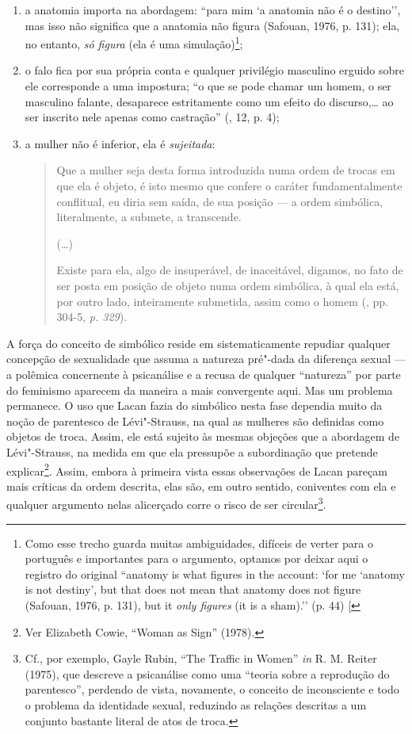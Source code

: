 \begin{enumerate}
\def\labelenumi{\arabic{enumi})}
\item
  a anatomia importa na abordagem: ``para mim `a anatomia não é o
  destino'', mas isso não significa que a anatomia não figura (Safouan,
  1976, p. 131); ela, no entanto, \emph{só figura} (ela é uma
  simulação)\footnote{Como esse trecho guarda muitas ambiguidades,
    difíceis de verter para o português e importantes para o argumento,
    optamos por deixar aqui o registro do original ``anatomy is what
    figures in the account: `for me `anatomy is not destiny', but that
    does not mean that anatomy does not figure (Safouan, 1976, p. 131),
    but it \emph{only figures} (it is a sham).'' (p. 44) {[}\versal{N.~T.}{]}};
\item
  o falo fica por sua própria conta e qualquer privilégio masculino
  erguido sobre ele corresponde a uma impostura; ``o que se pode chamar
  um homem, o ser masculino falante, desaparece estritamente como um
  efeito do discurso,\ldots{} ao ser inscrito nele apenas como castração''
  (, 12, p. 4);
\item
  a mulher não é inferior, ela é \emph{sujeitada}:
\begin{quote}
Que a mulher seja desta forma introduzida numa ordem de trocas em que
ela é objeto, é isto mesmo que confere o caráter fundamentalmente
conflitual, eu diria sem saída, de sua posição --- a ordem simbólica,
literalmente, a submete, a transcende.

(\ldots{})

Existe para ela, algo de insuperável, de inaceitável, digamos, no fato
de ser posta em posição de objeto numa ordem simbólica, à qual ela está,
por outro lado, inteiramente submetida, assim como o homem (, pp.
304-5, \emph{p. 329}).
\end{quote}
\end{enumerate}

A força do conceito de simbólico reside em sistematicamente repudiar
qualquer concepção de sexualidade que assuma a natureza pré"-dada da
diferença sexual --- a polêmica concernente à psicanálise e a recusa de
qualquer ``natureza'' por parte do feminismo aparecem da maneira a mais
convergente aqui. Mas um problema permanece. O uso que Lacan fazia do
simbólico nesta fase dependia muito da noção de parentesco de
Lévi"-Strauss, na qual as mulheres são definidas como objetos de troca.
Assim, ele está sujeito às mesmas objeções que a abordagem de
Lévi"-Strauss, na medida em que ela pressupõe a subordinação que pretende
explicar\footnote{Ver Elizabeth Cowie, ``Woman as Sign'' (1978).}.
Assim, embora à primeira vista essas observações de Lacan pareçam mais
críticas da ordem descrita, elas são, em outro sentido, coniventes com
ela e qualquer argumento nelas alicerçado corre o risco de ser
circular\footnote{Cf., por exemplo, Gayle Rubin, ``The Traffic in Women''
  \emph{in} R. M. Reiter (1975), que descreve a psicanálise como uma
  ``teoria sobre a reprodução do parentesco'', perdendo de vista,
  novamente, o conceito de inconsciente e todo o problema da identidade
  sexual, reduzindo as relações descritas a um conjunto bastante literal
  de atos de troca.}.

